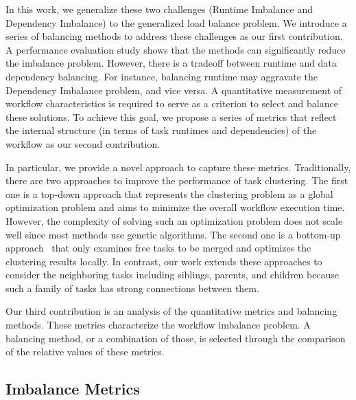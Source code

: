 In this work, we generalize these two challenges (Runtime Imbalance and Dependency Imbalance) to the generalized load balance problem. We introduce a series of balancing methods to address these challenges as our first contribution. A performance evaluation study shows that the methods can significantly reduce the imbalance problem.
However, there is a tradeoff between runtime and data dependency balancing. For instance, 
balancing runtime may aggravate the Dependency Imbalance problem, and vice versa. A quantitative measurement of workflow characteristics is required to serve as a criterion to select and balance these solutions. To achieve this goal, we propose a series of metrics that reflect the internal structure (in terms of task runtimes and dependencies) of the workflow as our second contribution. 

In particular, we provide a novel approach to capture these metrics. Traditionally, there are two approaches to improve the performance of task clustering. The first one is a top-down approach \cite{6217508} that represents the clustering problem as a global optimization problem and aims to minimize the overall workflow execution time. However, the complexity of solving such an optimization problem does not scale well since most methods use genetic algorithms. The second one is a bottom-up approach~\cite{Muthuvelu:2005:DJG:1082290.1082297,4958835} that only examines free tasks to be merged and optimizes the clustering results locally. In contrast, our work extends these approaches to consider the neighboring tasks including siblings, parents, and children because such a family of tasks has strong connections between them. 

Our third contribution is an analysis of the quantitative metrics and balancing methods. These metrics characterize the workflow imbalance problem. A balancing method, or a combination of those, is selected through the comparison of the relative values of these metrics.

\subsection{Imbalance Metrics}


